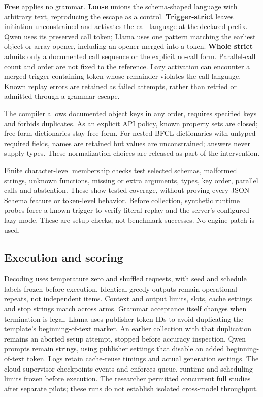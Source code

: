 \documentclass[10pt,twocolumn]{article}
\begin{document}
\textbf{Free} applies no grammar. \textbf{Loose} unions the schema-shaped language with arbitrary text, reproducing the escape as a control. \textbf{Trigger-strict} leaves initiation unconstrained and activates the call language at the declared prefix. Qwen uses its preserved call token; Llama uses one pattern matching the earliest object or array opener, including an opener merged into a token. \textbf{Whole strict} admits only a documented call sequence or the explicit no-call form. Parallel-call count and order are not fixed to the reference. Lazy activation can encounter a merged trigger-containing token whose remainder violates the call language. Known replay errors are retained as failed attempts, rather than retried or admitted through a grammar escape.

The compiler allows documented object keys in any order, requires specified keys and forbids duplicates. As an explicit API policy, known property sets are closed; free-form dictionaries stay free-form. For nested BFCL dictionaries with untyped required fields, names are retained but values are unconstrained; answers never supply types. These normalization choices are released as part of the intervention.

Finite character-level membership checks test selected schemas, malformed strings, unknown functions, missing or extra arguments, types, key order, parallel calls and abstention. These show tested coverage, without proving every JSON Schema feature or token-level behavior. Before collection, synthetic runtime probes force a known trigger to verify literal replay and the server's configured lazy mode. These are setup checks, not benchmark successes. No engine patch is used.

\subsection{Execution and scoring}
Decoding uses temperature zero and shuffled requests, with seed and schedule labels frozen before execution. Identical greedy outputs remain operational repeats, not independent items. Context and output limits, slots, cache settings and stop strings match across arms. Grammar acceptance itself changes when termination is legal. Llama uses publisher token IDs to avoid duplicating the template's beginning-of-text marker. An earlier collection with that duplication remains an aborted setup attempt, stopped before accuracy inspection. Qwen prompts remain strings, using publisher settings that disable an added beginning-of-text token. Logs retain cache-reuse timings and actual generation settings. The cloud supervisor checkpoints events and enforces queue, runtime and scheduling limits frozen before execution. The researcher permitted concurrent full studies after separate pilots; these runs do not establish isolated cross-model throughput.
\end{document}
